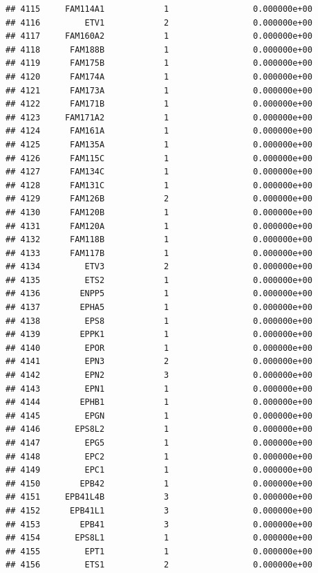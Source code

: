 \documentclass[
]{article}
\begin{document}
\begin{verbatim}
## 4115     FAM114A1            1                 0.000000e+00
## 4116         ETV1            2                 0.000000e+00
## 4117     FAM160A2            1                 0.000000e+00
## 4118      FAM188B            1                 0.000000e+00
## 4119      FAM175B            1                 0.000000e+00
## 4120      FAM174A            1                 0.000000e+00
## 4121      FAM173A            1                 0.000000e+00
## 4122      FAM171B            1                 0.000000e+00
## 4123     FAM171A2            1                 0.000000e+00
## 4124      FAM161A            1                 0.000000e+00
## 4125      FAM135A            1                 0.000000e+00
## 4126      FAM115C            1                 0.000000e+00
## 4127      FAM134C            1                 0.000000e+00
## 4128      FAM131C            1                 0.000000e+00
## 4129      FAM126B            2                 0.000000e+00
## 4130      FAM120B            1                 0.000000e+00
## 4131      FAM120A            1                 0.000000e+00
## 4132      FAM118B            1                 0.000000e+00
## 4133      FAM117B            1                 0.000000e+00
## 4134         ETV3            2                 0.000000e+00
## 4135         ETS2            1                 0.000000e+00
## 4136        ENPP5            1                 0.000000e+00
## 4137        EPHA5            1                 0.000000e+00
## 4138         EPS8            1                 0.000000e+00
## 4139        EPPK1            1                 0.000000e+00
## 4140         EPOR            1                 0.000000e+00
## 4141         EPN3            2                 0.000000e+00
## 4142         EPN2            3                 0.000000e+00
## 4143         EPN1            1                 0.000000e+00
## 4144        EPHB1            1                 0.000000e+00
## 4145         EPGN            1                 0.000000e+00
## 4146       EPS8L2            1                 0.000000e+00
## 4147         EPG5            1                 0.000000e+00
## 4148         EPC2            1                 0.000000e+00
## 4149         EPC1            1                 0.000000e+00
## 4150        EPB42            1                 0.000000e+00
## 4151     EPB41L4B            3                 0.000000e+00
## 4152      EPB41L1            3                 0.000000e+00
## 4153        EPB41            3                 0.000000e+00
## 4154       EPS8L1            1                 0.000000e+00
## 4155         EPT1            1                 0.000000e+00
## 4156         ETS1            2                 0.000000e+00

\end{verbatim}
\end{document}

